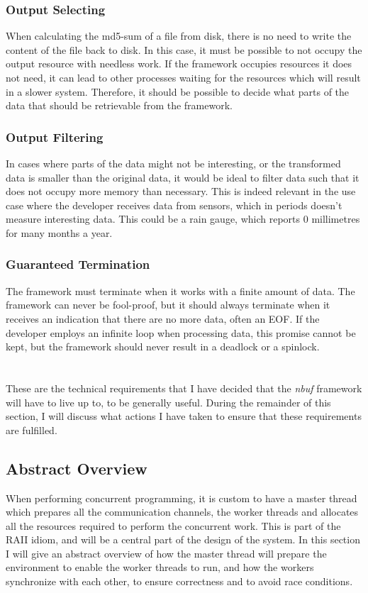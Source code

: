 \documentclass[a4paper]{article}
\newcommand{\nbuf}{\textit{nbuf} }
\begin{document}
\subsubsection{Output Selecting}
When calculating the md5-sum of a file from disk, there is no need to write the content of the file back to disk. In this case, it must be possible to not occupy the output resource with needless work. If the framework occupies resources it does not need, it can lead to other processes waiting for the resources which will result in a slower system. Therefore, it should be possible to decide what parts of the data that should be retrievable from the framework.


\subsubsection{Output Filtering}
In cases where parts of the data might not be interesting, or the transformed data is smaller than the original data, it would be ideal to filter data such that it does not occupy more memory than necessary. This is indeed relevant in the use case where the developer receives data from sensors, which in periods doesn't measure interesting data. This could be a rain gauge, which reports 0 millimetres for many months a year.


\subsubsection{Guaranteed Termination}
The framework must terminate when it works with a finite amount of data. The framework can never be fool-proof, but it should always terminate when it receives an indication that there are no more data, often an EOF. If the developer employs an infinite loop when processing data, this promise cannot be kept, but the framework should never result in a deadlock or a spinlock.\\\\\\


These are the technical requirements that I have decided that the \nbuf framework will have to live up to, to be generally useful. During the remainder of this section, I will discuss what actions I have taken to ensure that these requirements are fulfilled.



\newpage
\subsection{Abstract Overview}
When performing concurrent programming, it is custom to have a master thread which prepares all the communication channels, the worker threads and allocates all the resources required to perform the concurrent work. This is part of the RAII idiom, and will be a central part of the design of the system. In this section I will give an abstract overview of how the master thread will prepare the environment to enable the worker threads to run, and how the workers synchronize with each other, to ensure correctness and to avoid race conditions.
\end{document}
